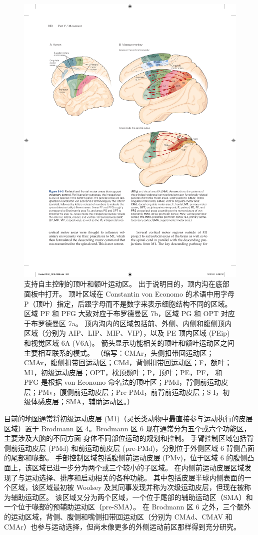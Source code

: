 \begin{figure}[htbp]
	\centering
	\includegraphics[width=0.95\linewidth]{chap34/fig_34_2}
	\caption{支持自主控制的顶叶和额叶运动区。 出于说明目的，顶内沟在底部面板中打开。 顶叶区域在 Constantin von Economo 的术语中用字母 P（顶叶）指定，后跟字母而不是数字来表示细胞结构不同的区域。 区域 PF 和 PFG 大致对应于布罗德曼区 7b，区域 PG 和 OPT 对应于布罗德曼区 7a。 顶内沟内的区域包括前、外侧、内侧和腹侧顶内区域（分别为 AIP、LIP、MIP、VIP），以及 PE 顶内区域 (PEip) 和视觉区域 6A (V6A)。 箭头显示功能相关的顶叶和额叶运动区之间主要相互联系的模式。 （缩写：CMAr，头侧扣带回运动区；CMAv，腹侧扣带回运动区；CMd，背侧扣带回运动区；F，额叶；M1，初级运动皮层；OPT，枕顶颞叶；P，顶叶；PE，PF， 和 PFG 是根据 von Economo 命名法的顶叶区；PMd，背侧前运动皮层；PMv，腹侧前运动皮层；Pre-PMd，前背前运动皮层；S-I，初级体感皮层；SMA，辅助运动区。）}
	\label{fig:34_2}
\end{figure}

目前的地图通常将初级运动皮层 (M1)（灵长类动物中最直接参与运动执行的皮层区域）置于 Brodmann 区 4。Brodmann 区 6 现在通常分为五个或六个功能区，主要涉及大脑的不同方面 身体不同部位运动的规划和控制。
手臂控制区域包括背侧前运动皮层 (PMd) 和前运动前皮层 (pre-PMd)，分别位于外侧区域 6 背侧凸面的尾部和喙部。
手部控制区域包括腹侧前运动皮层 (PMv)，位于区域 6 的腹侧凸面上，该区域已进一步分为两个或三个较小的子区域。
在内侧前运动皮层区域发现了与运动选择、排序和启动相关的各种功能。
其中包括皮层半球内侧表面的一个区域，该区域最初被 Woolsey 及其同事发现并称为次级运动皮层，但现在被称为辅助运动区。
该区域又分为两个区域，一个位于尾部的辅助运动区（SMA）和一个位于喙部的预辅助运动区（pre-SMA）。
在 Brodmann 区 6 之外，三个额外的运动区域，背侧、腹侧和嘴侧扣带回运动区（分别为 CMAd、CMAV 和 CMAr）也参与运动选择，但尚未像更多的外侧运动前区那样得到充分研究。

